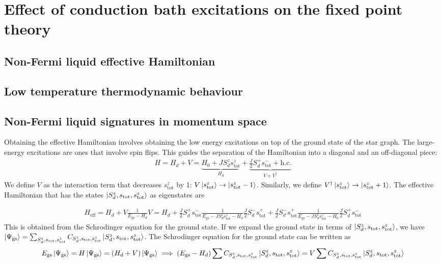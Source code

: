 \documentclass[reprint,prb,superscriptaddress]{revtex4-2}
\begin{document}
\section{Effect of conduction bath excitations on the fixed point theory}
\subsection{Non-Fermi liquid effective Hamiltonian}

\subsection{Low temperature thermodynamic behaviour}

\subsection{Non-Fermi liquid signatures in momentum space}
Obtaining the effective Hamiltonian involves obtaining the low energy excitations on top of the ground state of the star graph. The large-energy excitations are ones that involve spin flips. This guides the separation of the Hamiltonian into a diagonal and an off-diagonal piece:
\begin{align}
	H = H_d + V = \underbrace{H_0 + J S_d^z s_\text{tot}^z}_{H_d} + \underbrace{\frac{J}{2}S_d^+ s_\text{tot}^- + \text{h.c.}}_{V + V^\dagger}
\end{align}
We define \(V\) as the interaction term that decreases \(s_\text{tot}^z\) by 1: \(V \ket{s_\text{tot}^z} \to \ket{s_\text{tot}^z - 1}\). Similarly, we define \(V^\dagger \ket{s_\text{tot}^z} \to \ket{s_\text{tot}^z + 1}\). The effective Hamiltonian that has the states \(\ket{S_d^z, s_\text{tot}, s_\text{tot}^z}\) as eigenstates are
\begin{widetext}
\begin{align}
	H_\text{eff} = H_d + V \frac{1}{E_\text{gs} - H_d}V = H_d + \frac{J}{2}S_d^+ s_\text{tot}^- \frac{1}{E_\text{gs} - J S_d^z s_\text{tot}^z - H_0}\frac{J}{2}S_d^- s_\text{tot}^+ +\frac{J}{2}S_d^- s_\text{tot}^+ \frac{1}{E_\text{gs} - J S_d^z s_\text{tot}^z - H_0}\frac{J}{2}S_d^+ s_\text{tot}^-
\end{align}
This is obtained from the Schrodinger equation for the ground state. If we expand the ground state in terms of \(\ket{S_d^z, s_\text{tot}, s_\text{tot}^z}\), we have  \(\ket{\Psi_\text{gs}} = \sum_{S_d^z, s_\text{tot},s_\text{tot}^z}C_{S_d^z, s_\text{tot},s_\text{tot}^z}\ket{S_d^z, s_\text{tot}, s_\text{tot}^z}\). The Schrodinger equation for the ground state can be written as
\begin{align}
	E_\text{gs}\ket{\Psi_\text{gs}} = H \ket{\Psi_\text{gs}} = \left(H_d + V\right)\ket{\Psi_\text{gs}} \implies \left(E_\text{gs} - H_d\right)\sum C_{S_d^z, s_\text{tot},s_\text{tot}^z}\ket{S_d^z, s_\text{tot}, s_\text{tot}^z} = V\sum C_{S_d^z, s_\text{tot},s_\text{tot}^z}\ket{S_d^z, s_\text{tot}, s_\text{tot}^z}
\end{align}
\end{widetext}
\end{document}
